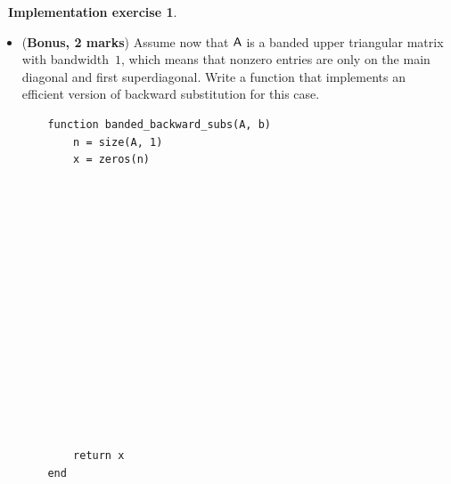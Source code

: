 \documentclass[10pt]{article}
\theoremstyle{definition}
\newtheorem{compexercise}{{\normalfont \faLaptop}~Implementation exercise}
\begin{document}
\begin{compexercise}
\begin{itemize}
        \item
            (\textbf{Bonus, 2 marks})
            Assume now that $\mathsf A$ is a banded upper triangular matrix with bandwidth~$1$,
            which means that nonzero entries are only on the main diagonal and first superdiagonal.
            Write a function  that implements an efficient version of backward substitution for this case.
            \begin{verbatim}
    function banded_backward_subs(A, b)
        n = size(A, 1)
        x = zeros(n)
















        return x
    end
            \end{verbatim}
    \end{itemize}
\end{compexercise}
\end{document}
